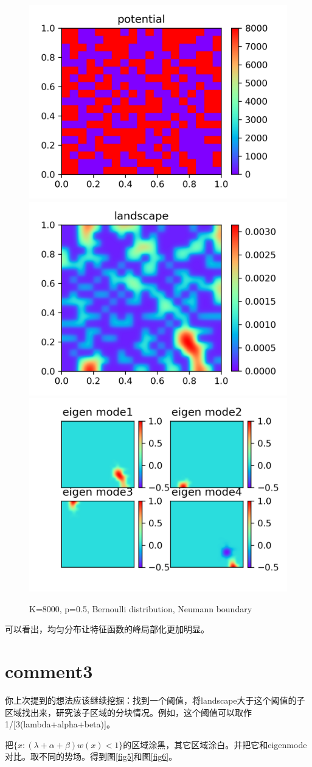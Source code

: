 \documentclass[UTF8,12pt]{article}
\begin{document}
\begin{figure}[htbp]
    \centering
    \includegraphics[width=0.3\linewidth]{pic/v3}
    \includegraphics[width=0.3\linewidth]{pic/w3}
    \includegraphics[width=0.3\linewidth]{pic/u3}
    \caption{K=8000, p=0.5, Bernoulli distribution, Neumann boundary}
    \label{fig4}
\end{figure}

可以看出，均匀分布让特征函数的峰局部化更加明显。


\section{comment3}

你上次提到的想法应该继续挖掘：找到一个阈值，将landscape大于这个阈值的子区域找出来，研究该子区域的分块情况。例如，这个阈值可以取作1/[3(lambda+alpha+beta)]。

把$\{x: (\lambda+\alpha+\beta)w(x) < 1\}$的区域涂黑，其它区域涂白。并把它和eigenmode对比。取不同的势场。得到图\ref{fig5}和图\ref{fig6}。
\end{document}
